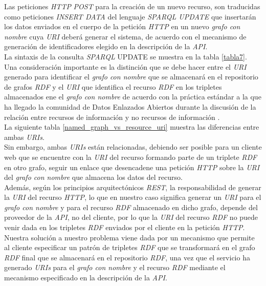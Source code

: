 Las  peticiones \textit{HTTP} \textit{POST} para la creaci\'on de un nuevo recurso, son traducidas como peticiones \textit{INSERT DATA} del lenguaje \textit{SPARQL UPDATE} que insertar\'an los datos enviados en el cuerpo de la petici\'on \textit{HTTP} en un nuevo \textit{grafo con nombre} cuya \textit{URI} deber\'a generar el sistema, de acuerdo con el mecanismo de generaci\'on de identificadores elegido en la descripci\'on de la \textit{API}.\\
La sintaxis de la consulta \textit{SPARQL} UPDATE se muestra en la tabla \ref{tabla7}.\\
Una consideraci\'on importante es la distinci\'on que se debe hacer entre el \textit{URI} generado para identificar el \textit{grafo con nombre} que se almacenar\'a en el repositorio de grafos \textit{RDF} y el \textit{URI} que identifica el recurso \textit{RDF} en los tripletes almacenados ene el \textit{grafo con nombre} de acuerdo con la pr\'actica est\'andar a la que ha llegado la comunidad de Datos Enlazados Abiertos durante la discusi\'on de la relaci\'on entre recursos de informaci\'on y no recursos de informaci\'on \cite{fielding2005httprange}.\\
La siguiente tabla \ref{named_graph_vs_resource_uri} muestra las diferencias entre ambas \textit{URIs}.\\
Sin embargo, ambas \textit{URIs} est\'an relacionadas, debiendo ser posible para un cliente web que se encuentre con la \textit{URI} del recurso formando parte de un triplete \textit{RDF} en otro grafo, seguir un enlace que desencadene una petici\'on \textit{HTTP} sobre la \textit{URI} del \textit{grafo con nombre} que almacena los datos del recurso.\\
Adem\'as, seg\'un los principios arquitect\'onicos \textit{REST}, la responsabilidad de generar la \textit{URI} del recurso \textit{HTTP}, lo que en nuestro caso significa generar un \textit{URI} para el \textit{grafo con nombre} y para el recurso \textit{RDF} almacenado en dicho grafo, depende del proveedor de la \textit{API}, no del cliente, por lo que la \textit{URI} del recurso \textit{RDF} no puede venir dada en los tripletes \textit{RDF} enviados por el cliente en la petici\'on \textit{HTTP}.\\
Nuestra soluci\'on a nuestro problema viene dada por un mecanismo que permite al cliente especificar un patr\'on de tripletes \textit{RDF} que se transformar\'a en el grafo \textit{RDF} final que se almacenar\'a en el repositorio \textit{RDF}, una vez que el servicio ha generado \textit{URIs} para el \textit{grafo con nombre} y el recurso \textit{RDF} mediante el mecanismo especificado en la descripci\'on de la \textit{API}.\\
